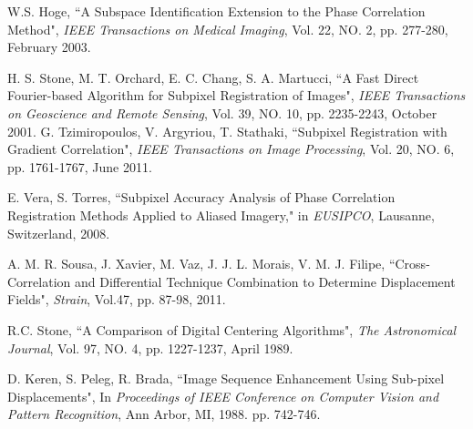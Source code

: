\documentclass[conference]{IEEEtran}
\begin{document}
\begin{thebibliography}{1}
W.S. Hoge, ``A Subspace Identification Extension to the Phase Correlation Method", \emph{IEEE Transactions on Medical Imaging}, Vol. 22, NO. 2, pp. 277-280, February 2003.

H. S. Stone, M. T. Orchard, E. C. Chang, S. A. Martucci, ``A Fast Direct Fourier-based Algorithm for Subpixel Registration of Images", \emph{IEEE Transactions on Geoscience and Remote Sensing}, Vol. 39, NO. 10, pp. 2235-2243, October 2001.
G. Tzimiropoulos, V. Argyriou, T. Stathaki, ``Subpixel Registration with Gradient Correlation", \emph{IEEE Transactions on Image Processing}, Vol. 20, NO. 6, pp. 1761-1767, June 2011.

E. Vera, S. Torres, ``Subpixel Accuracy Analysis of Phase Correlation Registration Methods Applied to Aliased Imagery," in \emph{EUSIPCO}, Lausanne, Switzerland, 2008.

A. M. R. Sousa, J. Xavier, M. Vaz, J. J. L. Morais,  V. M. J. Filipe, ``Cross-Correlation and Differential Technique Combination to Determine Displacement Fields", \emph{Strain}, Vol.47, pp. 87-98, 2011.

R.C. Stone, ``A Comparison of Digital Centering Algorithms", \emph{The Astronomical Journal}, Vol. 97, NO. 4, pp. 1227-1237, April 1989.

D. Keren, S. Peleg, R. Brada, ``Image Sequence Enhancement Using Sub-pixel Displacements", In \emph{Proceedings of IEEE Conference on Computer Vision and Pattern Recognition}, Ann Arbor, MI, 1988. pp. 742-746.
\end{thebibliography}

\end{document}
